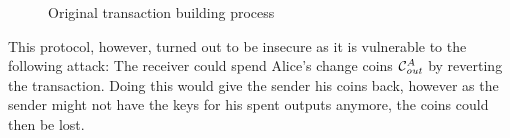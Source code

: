 \begin{figure}
    \centering
    \caption{Original transaction building process\label{fig:txOriginal}}
\end{figure}

This protocol, however, turned out to be insecure as it is vulnerable to the following attack:
The receiver could spend Alice's change coins $\mathcal{C}_{\mathit{out}}^A$ by reverting the transaction.
Doing this would give the sender his coins back, however as the sender might not have the keys for his spent outputs anymore, the coins could then be lost.

